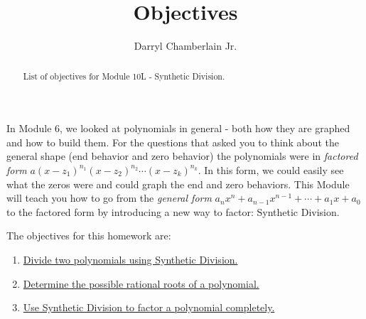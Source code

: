 \documentclass{ximera}
\author{Darryl Chamberlain Jr.}
\title{Objectives}
\begin{document}
\begin{abstract}
List of objectives for Module 10L - Synthetic Division.
\end{abstract}
\maketitle

In Module 6, we looked at polynomials in general - both how they are graphed and how to build them. For the questions that asked you to think about the general shape (end behavior and zero behavior) the polynomials were in \textit{factored form} $a(x-z_1)^{n_1}(x-z_2)^{n_2} \cdots (x-z_k)^{n_k}$. In this form, we could easily see what the zeros were and could graph the end and zero behaviors. This Module will teach you how to go from the \textit{general form} $a_n x^n + a_{n-1} x^{n-1} + \cdots + a_1 x + a_0$ to the factored form by introducing a new way to factor: Synthetic Division.
 
The objectives for this homework are:
\begin{enumerate}
    \item \href{https://cnx.org/contents/mwjClAV_@8.1:EfK9BY7_@13/Dividing-Polynomials}{Divide two polynomials using Synthetic Division.}
    \item \href{https://cnx.org/contents/mwjClAV_@8.1:G7V9LHif@17/Zeros-of-Polynomial-Functions}{Determine the possible rational roots of a polynomial.}
    \item \href{https://cnx.org/contents/mwjClAV_@8.1:G7V9LHif@17/Zeros-of-Polynomial-Functions}{Use Synthetic Division to factor a polynomial completely.}
\end{enumerate}
\end{document}
